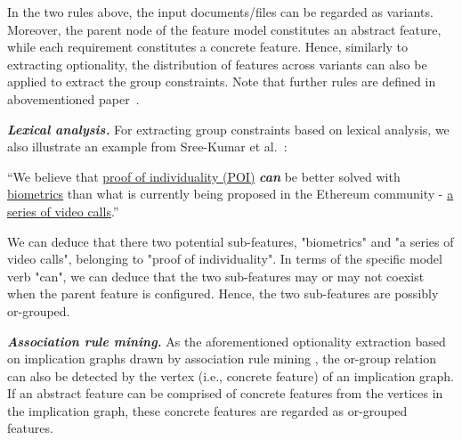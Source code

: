 \documentclass[graybox]{svmult}
\begin{document}
In the two rules above, the input documents/files can be regarded as variants. 
Moreover, the parent node of the feature model constitutes an abstract feature, while each requirement constitutes a concrete feature. Hence, similarly to extracting optionality, the distribution of features across variants can also be applied to extract the group constraints. 
Note that further rules are defined in abovementioned paper~\cite{LiSS18}.



\textit{\textbf{Lexical analysis.}} For extracting group constraints based on lexical analysis, we also illustrate an example from Sree-Kumar et al.~\cite{Sree-KumarPC18}:

\vspace{2mm}
\begin{mdframed}[style=mystyle]
``We believe that \uline{proof of individuality (POI)} \textit{\textbf{can}} be better solved with \uline{biometrics} than what is currently being proposed in the Ethereum community - \uline{a series of video calls}.''
\end{mdframed}
\vspace{4mm}



We can deduce that there two potential sub-features, "biometrics" and "a series of video calls", belonging to "proof of individuality". In terms of the specific model verb "can", we can deduce that the two sub-features may or may not coexist when the parent feature is configured. Hence, the two sub-features are possibly or-grouped.


\textit{\textbf{Association rule mining.}} As the aforementioned optionality extraction based on implication graphs drawn by association rule mining \cite{DavrilDHACH13}, the or-group relation can also be detected by the vertex (i.e., concrete feature) of an implication graph. If an abstract feature can be comprised of concrete features from the vertices in the implication graph, these concrete features are regarded as or-grouped features.
\end{document}
